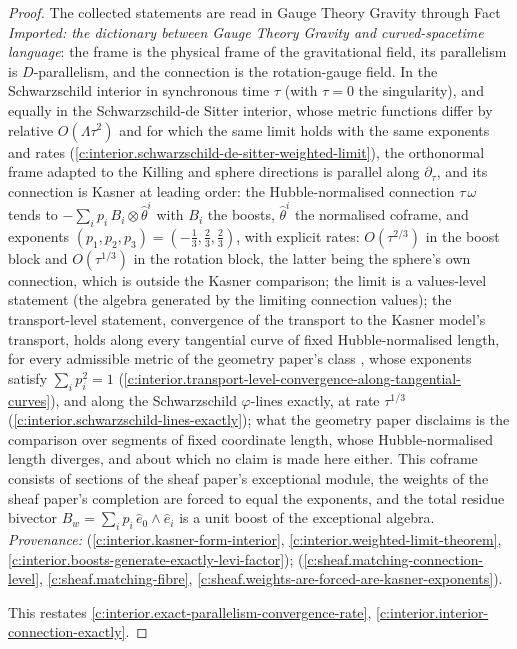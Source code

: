 \documentclass[11pt]{article}
\theoremstyle{definition}
\theoremstyle{plain}
\begin{document}
\begin{proof}
The collected statements are read in Gauge Theory Gravity through Fact \emph{Imported: the dictionary between Gauge Theory Gravity and curved-spacetime language}: the frame is the physical frame of the gravitational field, its parallelism is $D$-parallelism, and the connection is the rotation-gauge field. In the Schwarzschild interior in synchronous time $\tau$ (with $\tau = 0$ the singularity), and equally in the Schwarzschild-de Sitter interior, whose metric functions differ by relative $O(\Lambda\tau^2)$ and for which the same limit holds with the same exponents and rates \cite[Thm.~5.9]{ButlerT6} (\ref{c:interior.schwarzschild-de-sitter-weighted-limit}), the orthonormal frame adapted to the Killing and sphere directions is parallel along $\partial_\tau$, and its connection is Kasner at leading order: the Hubble-normalised connection $\tau\,\omega$ tends to $-\sum_i p_i\, B_i \otimes \hat\theta^i$ with $B_i$ the boosts, $\hat\theta^i$ the normalised coframe, and exponents $(p_1, p_2, p_3) = (-\tfrac13, \tfrac23, \tfrac23)$, with explicit rates: $O(\tau^{2/3})$ in the boost block and $O(\tau^{1/3})$ in the rotation block, the latter being the sphere's own connection, which is outside the Kasner comparison; the limit is a values-level statement (the algebra generated by the limiting connection values); the transport-level statement, convergence of the transport to the Kasner model's transport, holds along every tangential curve of fixed Hubble-normalised length, for every admissible metric of the geometry paper's class \cite[Def.~5.5]{ButlerT6}, whose exponents satisfy $\sum_i p_i^2 = 1$ \cite[Thm.~5.11]{ButlerT6} (\ref{c:interior.transport-level-convergence-along-tangential-curves}), and along the Schwarzschild $\varphi$-lines exactly, at rate $\tau^{1/3}$ \cite[Cor.~5.12]{ButlerT6} (\ref{c:interior.schwarzschild-lines-exactly}); what the geometry paper disclaims is the comparison over segments of fixed coordinate length, whose Hubble-normalised length diverges, and about which no claim is made here either. This coframe consists of sections of the sheaf paper's exceptional module, the weights of the sheaf paper's completion are forced to equal the exponents, and the total residue bivector $B_w = \sum_i p_i\, \hat e_0\wedge\hat e_i$ is a unit boost of the exceptional algebra. \emph{Provenance:} \cite[Lems.~5.1-5.4, Def.~5.5, Thm.~5.6, Thm.~5.9, Thm.~5.11, Cor.~5.12]{ButlerT6} (\ref{c:interior.kasner-form-interior}, \ref{c:interior.weighted-limit-theorem}, \ref{c:interior.boosts-generate-exactly-levi-factor}); \cite[Thm.~8.16, Prop.~8.26, Thm.~8.27]{ButlerT4} (\ref{c:sheaf.matching-connection-level}, \ref{c:sheaf.matching-fibre}, \ref{c:sheaf.weights-are-forced-are-kasner-exponents}).

This restates \ref{c:interior.exact-parallelism-convergence-rate}, \ref{c:interior.interior-connection-exactly}.

\end{proof}
\end{document}

